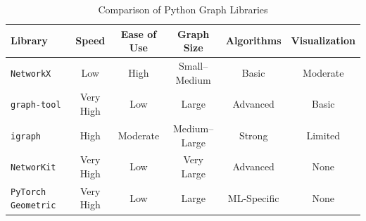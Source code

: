 \begin{table}[h!]
\centering
\begin{tabular}{@{}lccccc@{}}
\toprule
\textbf{Library} & \textbf{Speed} & \textbf{Ease of Use} & \textbf{Graph Size} & \textbf{Algorithms} & \textbf{Visualization} \\
\midrule
\texttt{NetworkX} & Low & High & Small–Medium & Basic & Moderate \\
\texttt{graph-tool} & Very High & Low & Large & Advanced & Basic \\
\texttt{igraph} & High & Moderate & Medium–Large & Strong & Limited \\
\texttt{NetworKit} & Very High & Low & Very Large & Advanced & None \\
\texttt{PyTorch Geometric} & Very High & Low & Large & ML-Specific & None \\
\bottomrule
\end{tabular}
\caption{Comparison of Python Graph Libraries}
\end{table}
